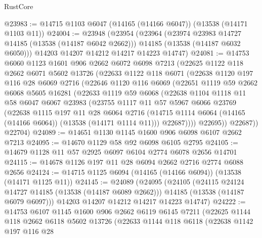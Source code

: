 \begin{lexlean}{RustCore}
\begin{coremodule}
@23983 := @14715 @1103 @6047 (@14165 (@14166 @6047)) (@13538 (@14171 @1103 @11))
@24004 := @23948
    (@23954
      (@23964
        (@23974 @23983 @14727 @14185 (@13538 (@14187 @6042 @2662)))
        @14185
        (@13538 (@14187 @6032 @6050)))
      @14203
      @14207
      @14212
      @14217
      @14223
      @14747)
@24081 := @14753
    @6060
    @1123
    @1601
    @906
    @2662
    @6072
    @6098
    @7213
    (@22625
      @1122
      @118
      @2662
      @6071
      @5602
      @13726
      (@22633
        @1122
        @118
        @6071
        (@22638
          @1120
          @197
          @116
          @28
          @6069
          @2716
          (@22646
            @1120
            @116
            @6069
            (@22651
              @1119
              @59
              @2662
              @6068
              @5605
              @16281
              (@22633
                @1119
                @59
                @6068
                (@22638
                  @1104
                  @1118
                  @11
                  @58
                  @6047
                  @6067
                  @23983
                  (@23755
                    @1117
                    @11
                    @57
                    @5967
                    @6066
                    @23769
                    (@22638
                      @1115
                      @197
                      @11
                      @28
                      @6064
                      @2716
                      (@14715 @1114 @6064 (@14165 (@14166 @6064)) (@13538 (@14171 @1114 @11)))
                      @22687))))
              @22695))
          @22687))
      @22704)
@24089 := @14651 @1130 @1145 @1600 @906 @6098 @6107 @2662 @7213
@24095 := @14670 @1129 @58 @92 @6098 @6105 @2795
@24105 := @14679 @1128 @11 @57 @2925 @6097 @6104 @2774 @6078 @2656 @14701
@24115 := @14678 @1126 @197 @11 @28 @6094 @2662 @2716 @2774 @6088 @2656
@24124 := @14715 @1125 @6094 (@14165 (@14166 @6094)) (@13538 (@14171 @1125 @11))
@24145 := @24089
    (@24095
      (@24105
        (@24115 @24124 @14727 @14185 (@13538 (@14187 @6089 @2662)))
        @14185
        (@13538 (@14187 @6079 @6097)))
      @14203
      @14207
      @14212
      @14217
      @14223
      @14747)
@24222 := @14753
    @6107
    @1145
    @1600
    @906
    @2662
    @6119
    @6145
    @7211
    (@22625
      @1144
      @118
      @2662
      @6118
      @5602
      @13726
      (@22633
        @1144
        @118
        @6118
        (@22638
          @1142
          @197
          @116
          @28

\end{coremodule}
\end{lexlean}
